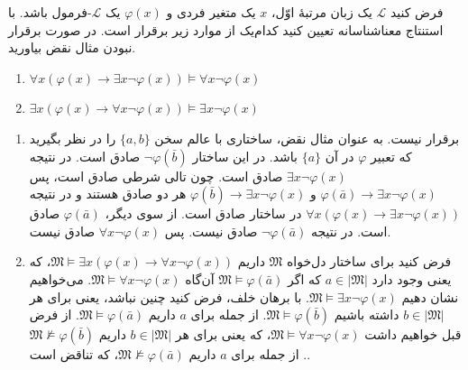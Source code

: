 فرض کنید $\mathcal{L}$ یک زبان مرتبهٔ اوّل، $x$ یک متغیر فردی و $\varphi(x)$ یک $\mathcal{L}$-فرمول باشد. با استنتاج معناشناسانه تعیین کنید کدام‌یک از موارد زیر برقرار است. در صورت برقرار نبودن مثال نقض بیاورید.
\begin{enumerate}[label=(\alph*)]
  \item $\forall x (\varphi(x) \to \exists x \neg \varphi(x)) \vDash \forall x \neg \varphi(x)$
  ~
  \item $\exists x (\varphi(x) \to \forall x \neg \varphi(x)) \vDash \exists x \neg \varphi(x)$
  ~
\end{enumerate} \quad
\begin{ans}
  \begin{enumerate}[label=(\alph*)]
    \item برقرار نیست. به عنوان مثال نقض، ساختاری با عالم سخن $\{ a, b \}$ را در نظر بگیرید که تعبیر $\varphi$ در آن $\{ a \}$ باشد. در این ساختار $\neg \varphi(\bar{b})$ صادق است. در نتیجه $\exists x \neg \varphi(x)$ صادق است. چون تالی شرطی صادق است، پس $\varphi(\bar{a}) \to \exists x \neg \varphi(x)$ و $\varphi(\bar{b}) \to \exists x \neg \varphi(x)$ هر دو صادق هستند و در نتیجه $\forall x (\varphi(x) \to \exists x \neg \varphi(x))$ در ساختار صادق است. از سوی دیگر، $\varphi(\bar{a})$ صادق است. در نتیجه $\neg \varphi(\bar{a})$ صادق نیست. پس $\forall x \neg \varphi(x)$ صادق نیست.
    \item فرض کنید برای ساختار دل‌خواه $\mathfrak{M}$ داریم $\mathfrak{M} \vDash \exists x (\varphi(x) \to \forall x \neg \varphi(x))$، که یعنی وجود دارد $a \in |\mathfrak{M}|$ که اگر $\mathfrak{M} \vDash \varphi(\bar{a})$ آن‌گاه $\mathfrak{M} \vDash \forall x \neg \varphi(x)$. می‌خواهیم نشان دهیم $\mathfrak{M} \vDash \exists x \neg \varphi(x)$. با برهان خلف، فرض کنید چنین نباشد، یعنی برای هر $b \in |\mathfrak{M}|$ داشته باشیم $\mathfrak{M} \vDash \varphi(\bar{b})$. از جمله برای $a$ داریم $\mathfrak{M} \vDash \varphi(\bar{a})$. از فرض قبل خواهیم داشت $\mathfrak{M} \vDash \forall x \neg \varphi(x)$، که یعنی برای هر $b \in |\mathfrak{M}|$ داریم $\mathfrak{M} \not\vDash \varphi(\bar{b})$. از جمله برای $a$ داریم $\mathfrak{M} \not\vDash \varphi(\bar{a})$، که تناقض است.
  \end{enumerate}
\end{ans}
